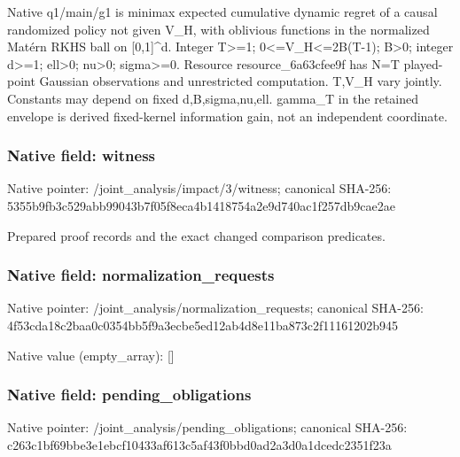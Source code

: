 \documentclass[10pt,a4paper]{article}
\begin{document}
\begingroup\raggedright\sloppy Native q1/\allowbreak{}main/\allowbreak{}g1 is minimax expected cumulative dynamic regret of a causal randomized policy not given V\_\allowbreak{}H,\allowbreak{} with oblivious functions in the normalized Mat{\AtlasUnicodeText é}\allowbreak{}rn RKHS ball on [0,\allowbreak{}1]\textasciicircum{}d. Integer T>=\allowbreak{}1;\allowbreak{} 0<=\allowbreak{}V\_\allowbreak{}H<=\allowbreak{}2B(T-1);\allowbreak{} B>0;\allowbreak{} integer d>=\allowbreak{}1;\allowbreak{} ell>0;\allowbreak{} nu>0;\allowbreak{} sigma>=\allowbreak{}0. Resource resource\_\allowbreak{}6a63cfee9f has N=\allowbreak{}T played-point Gaussian observations and unrestricted computation. T,\allowbreak{}V\_\allowbreak{}H vary jointly. Constants may depend on fixed d,\allowbreak{}B,\allowbreak{}sigma,\allowbreak{}nu,\allowbreak{}ell. gamma\_\allowbreak{}T in the retained envelope is derived fixed-kernel information gain,\allowbreak{} not an independent coordinate.\par\endgroup

\subsubsection{Native field: witness}
Native pointer: /joint\_\allowbreak{}analysis/impact/3/witness; canonical SHA-256: 5355b9fb3c529abb99043b7f05f8eca4b1418754a2e9d740ac1f257db9cae2ae

\begingroup\raggedright\sloppy Prepared proof records and the exact changed comparison predicates.\par\endgroup

\subsubsection{Native field: normalization\_\allowbreak{}requests}
Native pointer: /joint\_\allowbreak{}analysis/normalization\_\allowbreak{}requests; canonical SHA-256: 4f53cda18c2baa0c0354bb5f9a3ecbe5ed12ab4d8e11ba873c2f11161202b945

Native value (empty\_\allowbreak{}array): []

\subsubsection{Native field: pending\_\allowbreak{}obligations}
Native pointer: /joint\_\allowbreak{}analysis/pending\_\allowbreak{}obligations; canonical SHA-256: c263c1bf69bbe3e1ebcf10433af613c5af43f0bbd0ad2a3d0a1dcedc2351f23a
\end{document}
